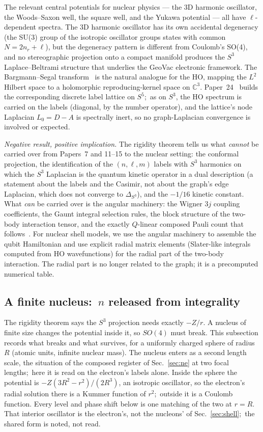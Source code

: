 \documentclass[twocolumn,prc,amsmath,amssymb,superscriptaddress]{revtex4-2}
\begin{document}
The relevant central potentials for nuclear physics --- the 3D
harmonic oscillator, the Woods--Saxon well, the square well, and the
Yukawa potential --- all have $\ell$-dependent spectra. The 3D harmonic
oscillator has its own accidental degeneracy (the SU(3) group of the
isotropic oscillator groups states with common $N = 2n_r + \ell$),
but the degeneracy pattern is different from Coulomb's SO(4), and no
stereographic projection onto a compact manifold produces the $S^3$
Laplace--Beltrami structure that underlies the GeoVac electronic
framework. The
Bargmann--Segal transform~\cite{Bargmann1961} is the natural analogue
for the HO, mapping the $L^2$ Hilbert space to a holomorphic
reproducing-kernel space on $\mathbb{C}^3$.  Paper~24~\cite{Paper24}
builds the corresponding discrete label lattice on $S^5$;\ as on $S^3$,
the HO spectrum is carried on the labels (diagonal, by the number
operator), and the lattice's node Laplacian $L_0 = D - A$ is spectrally
inert, so no graph-Laplacian convergence is involved or expected.

\emph{Negative result, positive implication.} The rigidity theorem
tells us what \emph{cannot} be carried over from Papers~7 and 11--15
to the nuclear setting: the conformal projection, the identification
of the $(n,\ell,m)$ labels with $S^3$ harmonics on which the $S^3$
Laplacian is the quantum kinetic operator in a dual description (a
statement about the labels and the Casimir, not about the graph's edge
Laplacian, which does not converge to $\Delta_{S^3}$), and the $-1/16$
kinetic constant. What
\emph{can} be carried over is the angular machinery: the Wigner $3j$
coupling coefficients, the Gaunt integral selection rules, the block
structure of the two-body interaction tensor, and the exactly
$Q$-linear composed Pauli count that follows~\cite{Paper22}. For nuclear shell models,
we use the angular machinery to assemble the qubit Hamiltonian and use
explicit radial matrix elements (Slater-like integrals computed from
HO wavefunctions) for the radial part of the two-body interaction. The
radial part is no longer related to the graph; it is a precomputed
numerical table.

\subsection{A finite nucleus:\ $n$ released from integrality}
\label{sec:finite_nucleus}

The rigidity theorem says the $S^3$ projection needs exactly $-Z/r$. A nucleus of finite size changes the potential inside it, so $SO(4)$ must break. This subsection records what breaks and what survives, for a uniformly charged sphere of radius $R$ (atomic units, infinite nuclear mass). The nucleus enters as a second length scale, the situation of the composed register of Sec.~\ref{sec:ne} at two focal lengths;\ here it is read on the electron's labels alone. Inside the sphere the potential is $-Z(3R^2 - r^2)/(2R^3)$, an isotropic oscillator, so the electron's radial solution there is a Kummer function of $r^2$;\ outside it is a Coulomb function. Every level and phase shift below is one matching of the two at $r = R$. That interior oscillator is the electron's, not the nucleons' of Sec.~\ref{sec:shell};\ the shared form is noted, not read.
\end{document}
